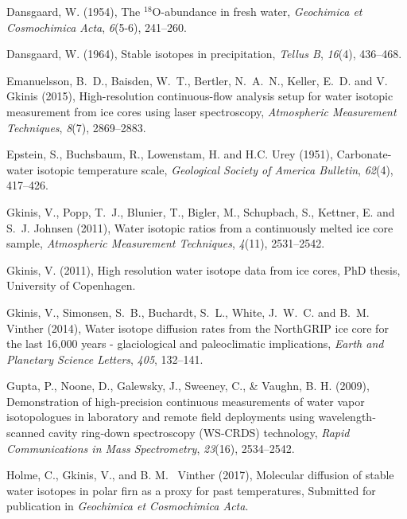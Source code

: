 \documentclass[draft, jgrga]{AGUTeX}
\begin{document}
\begin{article}
\begin{thebibliography}{}
 Dansgaard, W. (1954),
The $^{18}${O}-abundance in fresh water,
\textit{Geochimica et Cosmochimica Acta}, \textit{6}(5-6), 241--260.

 Dansgaard, W. (1964),
Stable isotopes in precipitation,
\textit{Tellus B}, \textit{16}(4), 436--468.

Emanuelsson, B.~D., Baisden, W.~T., Bertler, N.~A.~N., Keller, E.~D. and V. Gkinis (2015),
High-resolution continuous-flow analysis setup for water isotopic measurement from ice cores using laser spectroscopy,
\textit{Atmospheric Measurement Techniques}, \textit{8}(7), 2869--2883.

Epstein, S., Buchsbaum, R., Lowenstam, H. and H.C. Urey (1951),
Carbonate-water isotopic temperature scale,
\textit{Geological Society of America Bulletin}, \textit{62}(4), 417--426.

Gkinis, V., Popp, T.~J., Blunier, T., Bigler, M., Schupbach, S., Kettner, E. and S.~J. Johnsen (2011),
Water isotopic ratios from a continuously melted ice core sample,
\textit{Atmospheric Measurement Techniques}, \textit{4}(11), 2531--2542.

Gkinis, V. (2011),
{ High resolution water isotope data from ice cores},
PhD thesis, University of Copenhagen.

Gkinis, V., Simonsen, S.~B., Buchardt, S.~L., White, J.~W.~C. and  B.~M. Vinther (2014),
{Water isotope diffusion rates from the NorthGRIP ice core for the last 16,000 years - glaciological and paleoclimatic implications},
\textit{Earth and Planetary Science Letters}, \textit{405}, 132--141.

Gupta, P., Noone, D., Galewsky, J., Sweeney, C., & Vaughn, B. H. (2009),
{Demonstration of high‐precision continuous measurements of water vapor isotopologues in laboratory and remote field deployments using wavelength‐scanned cavity ring‐down spectroscopy (WS‐CRDS) technology},
\textit{Rapid Communications in Mass Spectrometry}, \textit{23}(16), 2534--2542.

Holme, C., Gkinis, V., and B. M. ~Vinther (2017), Molecular
diffusion of stable water isotopes in polar firn as a proxy
for past temperatures, Submitted for publication in \textit{Geochimica et Cosmochimica Acta}.


\end{thebibliography}
\end{article}
\end{document}
